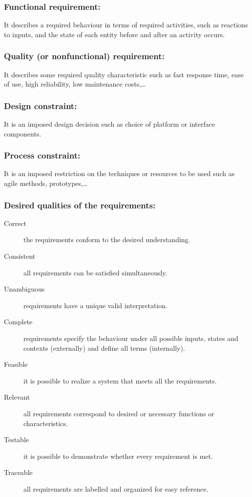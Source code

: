\subsubsection{Functional requirement:}
It describes a required behaviour in terms of required activities, such as reactions to inputs,
and the state of each entity before and after an activity occurs.

\subsubsection{Quality (or nonfunctional) requirement:}
It describes some required quality characteristic such as fast response time, ease of use,
high reliability, low maintenance costs,\ldots

\subsubsection{Design constraint:}
It is an imposed design decision such as choice of platform or interface components.

\subsubsection{Process constraint:}
It is an imposed restriction on the techniques or resources to be used such as agile methods,
prototypes,\ldots

\subsubsection{Desired qualities of the requirements:}

\begin{description}
    \item[Correct] the requirements conform to the desired understanding.
    \item[Consistent] all requirements can be satisfied simultaneously.
    \item[Unambiguous] requirements have a unique valid interpretation.
    \item[Complete] requirements specify the behaviour under all possible inputs, states and
contexts (externally) and define all terms (internally).
    \item[Feasible] it is possible to realize a system that meets all the requirements.
    \item[Relevant] all requirements correspond to desired or necessary functions or
characteristics.
    \item[Testable] it is possible to demonstrate whether every requirement is met.
    \item[Traceable] all requirements are labelled and organized for easy reference.
\end{description}

